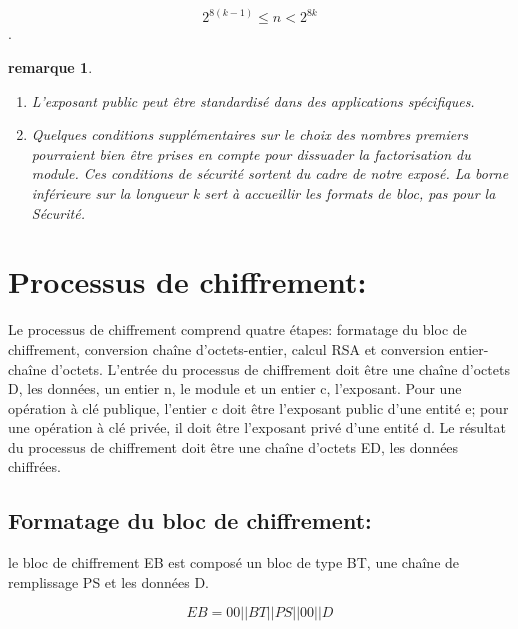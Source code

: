 \documentclass{article}
\newtheorem{remark}{remarque}
\begin{document}
                           $$2^{8(k-1)}\leq n<2^{8k}$$.


\begin{remark}
\par\leavevmode\par
\begin{enumerate}
\item  L'exposant public peut être standardisé dans des applications spécifiques.
\item  Quelques conditions supplémentaires sur le choix des nombres premiers pourraient bien être prises en compte pour dissuader la factorisation du module. Ces conditions de sécurité sortent du cadre de notre exposé. La borne inférieure sur la longueur k sert à accueillir les formats de bloc, pas pour la Sécurité.
\end{enumerate}
\end{remark}

\section{Processus de chiffrement:}

Le processus de chiffrement comprend quatre étapes: formatage du bloc de chiffrement, conversion chaîne d’octets-entier, calcul RSA et conversion entier-chaîne d’octets. 
L'entrée du processus de chiffrement doit être une chaîne d'octets D, les données, un entier n, le module et un entier c, l'exposant. Pour une opération à clé publique, l'entier c doit être l'exposant public d'une entité e; pour une opération à clé privée, il doit être l'exposant privé d'une entité d. Le résultat du processus de chiffrement doit être une chaîne d'octets ED, les données chiffrées.

\subsection{Formatage du bloc de chiffrement:}
le bloc de chiffrement EB est composé un bloc de type BT, une chaîne de remplissage PS et les données D.
                                    
                        $$EB = 00 || BT || PS || 00 || D$$ 
\end{document}
